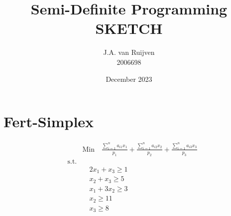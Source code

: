 \documentclass{article}
\title{Semi-Definite Programming SKETCH}
\author{J.A. van Ruijven \\ 2006698 }
\date{December 2023}
\begin{document}
\maketitle
\section{Fert-Simplex} 
\begin{align}
	& \text{Min} \quad
	 \frac{\sum_{i=1}^{n}a_{i1}x_1}{p_1} +
	 \frac{\sum_{i=1}^{n}a_{i2}x_2}{p_2} +
	 \frac{\sum_{i=1}^{n}a_{i3}x_3}{p_3} \\
	  \quad \text{s.t.} \\
	& \quad 2x_1 + x_3 \geq 1 \\
	& \quad x_2 + x_3 \geq 5 \\
	& \quad x_1 + 3x_2 \geq 3 \\
	& \quad x_2 \geq 11 \\
	& \quad x_3 \geq 8 \\
\end{align}
\label{eq:Fert-Simplex minimization}
\end{document}
